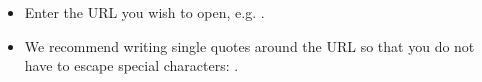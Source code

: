 
\begin{itemize}
\item Enter the URL you wish to open, e.g. .
\item We recommend writing single quotes around the URL so that you do not have to escape special characters: .
\end{itemize}
